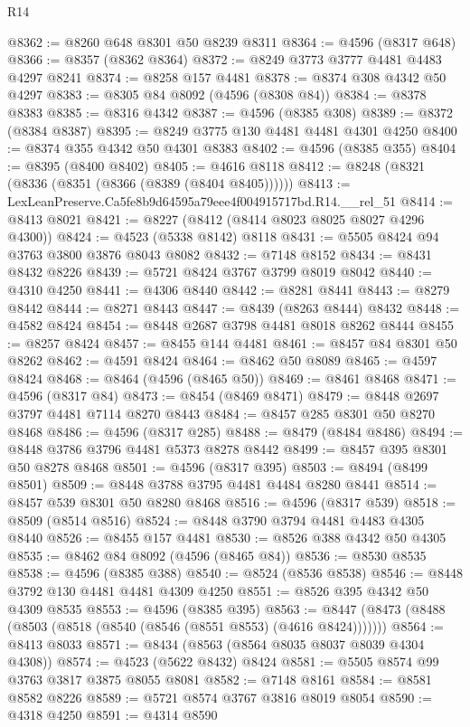 \begin{lexlean}{R14}
\begin{coremodule}
@8362 := @8260 @648 @8301 @50 @8239 @8311
@8364 := @4596 (@8317 @648)
@8366 := @8357 (@8362 @8364)
@8372 := @8249 @3773 @3777 @4481 @4483 @4297 @8241
@8374 := @8258 @157 @4481
@8378 := @8374 @308 @4342 @50 @4297
@8383 := @8305 @84 @8092 (@4596 (@8308 @84))
@8384 := @8378 @8383
@8385 := @8316 @4342
@8387 := @4596 (@8385 @308)
@8389 := @8372 (@8384 @8387)
@8395 := @8249 @3775 @130 @4481 @4481 @4301 @4250
@8400 := @8374 @355 @4342 @50 @4301 @8383
@8402 := @4596 (@8385 @355)
@8404 := @8395 (@8400 @8402)
@8405 := @4616 @8118
@8412 := @8248 (@8321 (@8336 (@8351 (@8366 (@8389 (@8404 @8405))))))
@8413 := LexLeanPreserve.Ca5fe8b9d64595a79eee4f004915717bd.R14.__rel_51
@8414 := @8413 @8021
@8421 := @8227 (@8412 (@8414 @8023 @8025 @8027 @4296 @4300))
@8424 := @4523 (@5338 @8142) @8118
@8431 := @5505 @8424 @94 @3763 @3800 @3876 @8043 @8082
@8432 := @7148 @8152
@8434 := @8431 @8432 @8226
@8439 := @5721 @8424 @3767 @3799 @8019 @8042
@8440 := @4310 @4250
@8441 := @4306 @8440
@8442 := @8281 @8441
@8443 := @8279 @8442
@8444 := @8271 @8443
@8447 := @8439 (@8263 @8444) @8432
@8448 := @4582 @8424
@8454 := @8448 @2687 @3798 @4481 @8018 @8262 @8444
@8455 := @8257 @8424
@8457 := @8455 @144 @4481
@8461 := @8457 @84 @8301 @50 @8262
@8462 := @4591 @8424
@8464 := @8462 @50 @8089
@8465 := @4597 @8424
@8468 := @8464 (@4596 (@8465 @50))
@8469 := @8461 @8468
@8471 := @4596 (@8317 @84)
@8473 := @8454 (@8469 @8471)
@8479 := @8448 @2697 @3797 @4481 @7114 @8270 @8443
@8484 := @8457 @285 @8301 @50 @8270 @8468
@8486 := @4596 (@8317 @285)
@8488 := @8479 (@8484 @8486)
@8494 := @8448 @3786 @3796 @4481 @5373 @8278 @8442
@8499 := @8457 @395 @8301 @50 @8278 @8468
@8501 := @4596 (@8317 @395)
@8503 := @8494 (@8499 @8501)
@8509 := @8448 @3788 @3795 @4481 @4484 @8280 @8441
@8514 := @8457 @539 @8301 @50 @8280 @8468
@8516 := @4596 (@8317 @539)
@8518 := @8509 (@8514 @8516)
@8524 := @8448 @3790 @3794 @4481 @4483 @4305 @8440
@8526 := @8455 @157 @4481
@8530 := @8526 @388 @4342 @50 @4305
@8535 := @8462 @84 @8092 (@4596 (@8465 @84))
@8536 := @8530 @8535
@8538 := @4596 (@8385 @388)
@8540 := @8524 (@8536 @8538)
@8546 := @8448 @3792 @130 @4481 @4481 @4309 @4250
@8551 := @8526 @395 @4342 @50 @4309 @8535
@8553 := @4596 (@8385 @395)
@8563 := @8447 (@8473 (@8488 (@8503 (@8518 (@8540 (@8546 (@8551 @8553) (@4616 @8424)))))))
@8564 := @8413 @8033
@8571 := @8434 (@8563 (@8564 @8035 @8037 @8039 @4304 @4308))
@8574 := @4523 (@5622 @8432) @8424
@8581 := @5505 @8574 @99 @3763 @3817 @3875 @8055 @8081
@8582 := @7148 @8161
@8584 := @8581 @8582 @8226
@8589 := @5721 @8574 @3767 @3816 @8019 @8054
@8590 := @4318 @4250
@8591 := @4314 @8590

\end{coremodule}
\end{lexlean}
